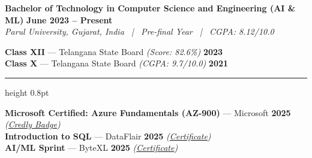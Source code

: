 \documentclass[10pt,a4paper]{article}
\newcommand{\resumesection}[1]{%
  \vspace{5pt}%
  \noindent{\large\textbf{#1}}\par
  \vspace{1pt}%
  \hrule height 0.8pt
  \vspace{3pt}%
}
\begin{document}
\noindent\textbf{Bachelor of Technology in Computer Science and Engineering (AI \& ML)} \hfill \textbf{June 2023 -- Present} \\
\textit{Parul University, Gujarat, India \ | \ Pre-final Year \ | \ CGPA: 8.12/10.0}

\vspace{1pt}

\noindent\textbf{Class XII} --- Telangana State Board \textit{(Score: 82.6\%)} \hfill \textbf{2023} \\
\noindent\textbf{Class X} --- Telangana State Board \textit{(CGPA: 9.7/10.0)} \hfill \textbf{2021}

\resumesection{CERTIFICATIONS}

\noindent\textbf{Microsoft Certified: Azure Fundamentals (AZ-900)} --- Microsoft \hfill \textbf{2025} \textit{(\href{https://www.credly.com/badges/cb01588f-556d-448d-84f3-aebeef100485/public_url}{Credly Badge})} \\
\noindent\textbf{Introduction to SQL} --- DataFlair \hfill \textbf{2025} \textit{(\href{https://drive.google.com/file/d/1oosWCwBwj4BE8eseplqIj-2Cx2dp42X3/view?usp=sharing}{Certificate})} \\
\noindent\textbf{AI/ML Sprint} --- ByteXL \hfill \textbf{2025} \textit{(\href{https://drive.google.com/file/d/1Didyx_p9tVhQ_uAG6CP7Sf4VfBXdAbES/view?usp=sharing}{Certificate})}
\end{document}
